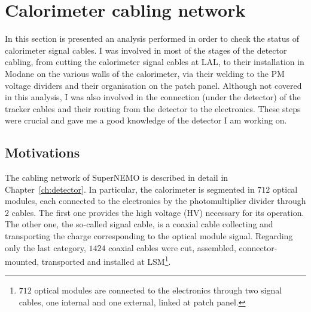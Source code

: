 \section{Calorimeter cabling network}
\label{sec:reflecto}

In this section is presented an analysis performed in order to check the status of calorimeter signal cables.
I was involved in most of the stages of the detector cabling, from cutting the calorimeter signal cables at LAL, to their installation in Modane on the various walls of the calorimeter, via their welding to the PM voltage dividers and their organisation on the patch panel.
Although not covered in this analysis, I was also involved in the connection (under the detector) of the tracker cables and their routing from the detector to the electronics.
These steps were crucial and gave me a good knowledge of the detector I am working on.

\subsection{Motivations}

The cabling network of SuperNEMO is described in detail in Chapter~\ref{ch:detector}.
In particular, the calorimeter is segmented in $712$ optical modules, each connected to the electronics by the photomultiplier divider through $2$ cables.
The first one provides the high voltage (HV) necessary for its operation.
The other one, the so-called signal cable, is a coaxial cable collecting and transporting the charge corresponding to the optical module signal.
Regarding only the last category, $1424$ coaxial cables were cut, assembled, connector-mounted, transported and installed at LSM\footnote{$712$ optical modules are connected to the electronics through two signal cables, one internal and one external, linked at patch panel.}.

